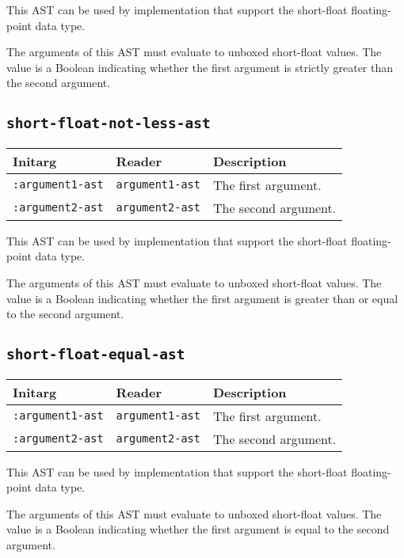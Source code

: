 This AST can be used by implementation that support the short-float
floating-point data type.  

The arguments of this AST must evaluate to unboxed short-float
values.  The value is a Boolean indicating whether the first argument
is strictly greater than the second argument.

\subsection{\texttt{short-float-not-less-ast}}
\label{sec-ast-short-float-not-less}

\begin{tabular}{|l|l|l|}
\hline
Initarg & Reader & Description\\
\hline\hline
\texttt{:argument1-ast} & \texttt{argument1-ast} & The first argument.\\
\hline
\texttt{:argument2-ast} & \texttt{argument2-ast} & The second argument.\\
\hline
\end{tabular}

This AST can be used by implementation that support the short-float
floating-point data type.  

The arguments of this AST must evaluate to unboxed short-float
values.  The value is a Boolean indicating whether the first argument
is greater than or equal to the second argument.

\subsection{\texttt{short-float-equal-ast}}
\label{sec-ast-short-float-equal}

\begin{tabular}{|l|l|l|}
\hline
Initarg & Reader & Description\\
\hline\hline
\texttt{:argument1-ast} & \texttt{argument1-ast} & The first argument.\\
\hline
\texttt{:argument2-ast} & \texttt{argument2-ast} & The second argument.\\
\hline
\end{tabular}

This AST can be used by implementation that support the short-float
floating-point data type.  

The arguments of this AST must evaluate to unboxed short-float
values.  The value is a Boolean indicating whether the first argument
is equal to the second argument.

